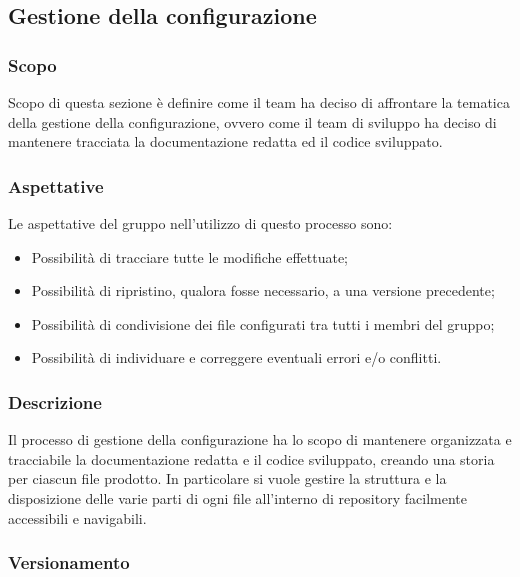 \vspace{2cm}

\subsection{Gestione della configurazione}\label{subsection:gestione_configurazione}
    \subsubsection{Scopo}
    Scopo di questa sezione è definire come il team \groupName{} ha deciso di affrontare la tematica della gestione della configurazione, ovvero come il team di sviluppo ha deciso di mantenere tracciata la documentazione redatta ed il codice sviluppato.

    \subsubsection{Aspettative}
    Le aspettative del gruppo \groupName{} nell'utilizzo di questo processo sono:
    \begin{itemize}
        \item Possibilità di tracciare tutte le modifiche effettuate;
        \item Possibilità di ripristino, qualora fosse necessario, a una versione precedente;
        \item Possibilità di condivisione dei file configurati tra tutti i membri del gruppo;
        \item Possibilità di individuare e correggere eventuali errori e/o conflitti.
    \end{itemize}

    \subsubsection{Descrizione}
    Il processo di gestione della configurazione ha lo scopo di mantenere organizzata e tracciabile la documentazione redatta e il codice sviluppato, creando una storia per ciascun file prodotto.
    In particolare si vuole gestire la struttura e la disposizione delle varie parti di ogni file all'interno di repository\glo{} facilmente accessibili e navigabili.

    \subsubsection{Versionamento}
